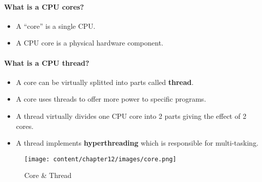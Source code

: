 \setlength{\columnsep}{3pt}
\begin{flushleft}
\bigskip
\paragraph{What is a CPU cores?}

\begin{itemize}
	\item A “core” is a single CPU. 
	\item A CPU core is a physical hardware component.	
\end{itemize}


\bigskip
\paragraph{What is a CPU thread?}
\begin{itemize}
	\item A core can be virtually splitted into parts called \textbf{thread}.
	\item A core uses threads to offer more power to specific programs.
	\item A thread virtually divides one CPU core into 2 parts giving the effect of 2 cores.
	\item A thread implements \textbf{hyperthreading} which is responsible for multi-tasking.
\end{itemize}

\begin{figure}[h!]
	\centering
	\texttt{[image: content/chapter12/images/core.png]}
	\caption{Core \& Thread}
	\label{fig:process3}
\end{figure}



\end{flushleft}

\newpage


